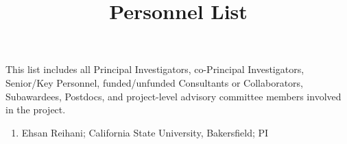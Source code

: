 \documentclass[12pt]{article}
\begin{document}
\title{Personnel List}
\author{}
\date{}
\maketitle

\noindent
This list includes all Principal Investigators, co-Principal Investigators, Senior/Key Personnel, funded/unfunded Consultants or Collaborators, Subawardees, Postdocs, and project-level advisory committee members involved in the project.

\vspace{12pt}

\begin{enumerate}[leftmargin=0pt, itemindent=1.5em, labelsep=0.5em]
\item Ehsan Reihani; California State University, Bakersfield; PI
\end{enumerate}
\end{document}
